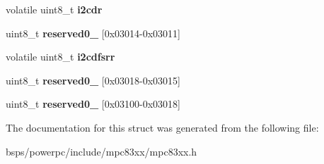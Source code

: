\begin{DoxyCompactItemize}
\item 
\mbox{\label{structm83xxI2CRegisters___a00c215c58104cf1ec58162248e128e78}} 
volatile uint8\+\_\+t {\bfseries i2cdr}
\item 
\mbox{\label{structm83xxI2CRegisters___ab09507e9459306376a6f9852a08624ee}} 
uint8\+\_\+t {\bfseries reserved0\+\_} \mbox{[}0x03014-\/0x03011\mbox{]}
\item 
\mbox{\label{structm83xxI2CRegisters___a8e38df70694fce495a5701db7e812378}} 
volatile uint8\+\_\+t {\bfseries i2cdfsrr}
\item 
\mbox{\label{structm83xxI2CRegisters___af707f54d60929cf64692eb45c941c787}} 
uint8\+\_\+t {\bfseries reserved0\+\_} \mbox{[}0x03018-\/0x03015\mbox{]}
\item 
\mbox{\label{structm83xxI2CRegisters___a696dd666df98de542b13b257febc088f}} 
uint8\+\_\+t {\bfseries reserved0\+\_} \mbox{[}0x03100-\/0x03018\mbox{]}
\end{DoxyCompactItemize}


The documentation for this struct was generated from the following file\+:\begin{DoxyCompactItemize}
\item 
bsps/powerpc/include/mpc83xx/mpc83xx.\+h\end{DoxyCompactItemize}
